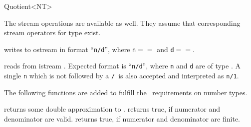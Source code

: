 \begin{ccClassTemplate} {Quotient<NT>}
\ccHidden {}
{}

The stream operations are available as well. 
They assume that corresponding stream operators for type  exist.

       {writes  to ostream  in format ``{\tt n/d}'', where
       {\tt n}$==$ and {\tt d}$==$.}

       {reads  from istream . Expected format is
        ``{\tt n/d}'', where {\tt n} and {\tt d} are of type .
        A single {\tt n} which is not followed by a {\tt /}\  is also
        accepted and interpreted as {\tt n/1}.}

The following functions are added to fulfill the \cgal\ requirements
on number types.

       {returns some double approximation to .}
\ccGlue
{}
       {returns true, if numerator and denominator are valid.}
\ccGlue
{}
       {returns true, if numerator and denominator are finite.}


\end{ccClassTemplate} 

